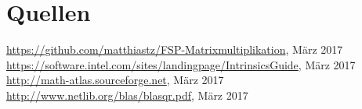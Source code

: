 \documentclass[a4paper,11pt]{scrartcl}
\begin{document}
\section{Quellen}
\begin{thebibliography}{9}

 \url{https://github.com/matthiastz/FSP-Matrixmultiplikation}, März 2017
 \url{https://software.intel.com/sites/landingpage/IntrinsicsGuide}, März 2017
 \url{http://math-atlas.sourceforge.net}, März 2017
 \url{http://www.netlib.org/blas/blasqr.pdf}, März 2017

\end{thebibliography}
\end{document}
